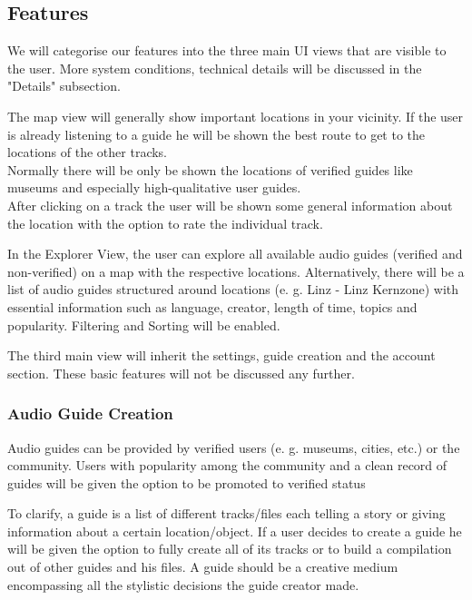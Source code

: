 \documentclass[12pt]{article}
\theoremstyle{definition}
\newenvironment{text}{
}{}
\begin{document}
\subsection{Features}
\begin{text}

We will categorise our features into the three main UI views that are visible to the user. More system conditions, technical details will be discussed in the "Details" subsection.

The map view will generally show important locations in your vicinity.
If the user is already listening to a guide he will be shown the best route to get to the locations of the other tracks.\\
Normally there will be only be shown the locations of verified guides like museums and especially high-qualitative user guides.\\
After clicking on a track the user will be shown some general information about the location with the option to rate the individual track. 

In the Explorer View, the user can explore all available audio guides (verified and non-verified) on a map with the respective locations. Alternatively, there will be a list of audio guides structured around locations (e. g. Linz - Linz Kernzone) with essential information such as language, creator, length of time, topics and popularity. Filtering and Sorting will be enabled.

The third main view will inherit the settings, guide creation and the account section. These basic features will not be discussed any further.

\subsubsection{Audio Guide Creation}
Audio guides can be provided by verified users (e. g. museums, cities, etc.) or the community. Users with popularity among the community and a clean record of guides will be given the option to be promoted to verified status

To clarify, a guide is a list of different tracks/files each telling a story or giving information about a certain location/object. If a user decides to create a guide he will be given the option to fully create all of its tracks or to build a compilation out of other guides and his files. A guide should be a creative medium encompassing all the stylistic decisions the guide creator made. \newline


\end{text}
\end{document}
